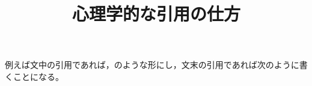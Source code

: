 \documentclass[uplatex]{jsarticle}
\begin{document}
\title{心理学的な引用の仕方}
\maketitle

例えば文中の引用であれば，\citet{越智2013}のような形にし，文末の引用であれば次のように書くことになる\citep{Blechman1990}。



\nocite{*}
\end{document}
